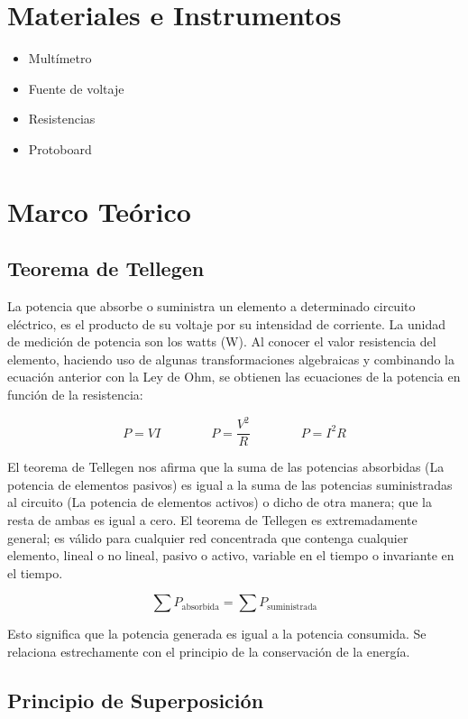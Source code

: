 \documentclass{article}
\begin{document}
    \section{Materiales e Instrumentos}

    \begin{itemize}
        \item Multímetro
        \item Fuente de voltaje
        \item Resistencias
        \item Protoboard
    \end{itemize}

    \section{Marco Teórico}

    \subsection{Teorema de Tellegen}

    La potencia que absorbe o suministra un elemento a determinado circuito eléctrico, es el producto de su voltaje por su intensidad de corriente. La unidad de medición de potencia son los watts (\unit{\watt}). Al conocer el valor resistencia del elemento, haciendo uso de algunas transformaciones algebraicas y combinando la ecuación anterior con la Ley de Ohm, se obtienen las ecuaciones de la potencia en función de la resistencia:

    \[
        P = VI \qquad\qquad P = \frac{V^2}{R} \qquad\qquad P = I^2 R
    \]

    El teorema de Tellegen nos afirma que la suma de las potencias absorbidas (La potencia de elementos pasivos) es igual a la suma de las potencias suministradas al circuito (La potencia de elementos activos) o dicho de otra manera; que la resta de ambas es igual a cero. El teorema de Tellegen es extremadamente general; es válido para cualquier red concentrada que contenga cualquier elemento, lineal o no lineal, pasivo o activo, variable en el tiempo o invariante en el tiempo.

    \[
        \sum P_{\text{absorbida}} = \sum P_{\text{suministrada}}
    \]

    Esto significa que la potencia generada es igual a la potencia consumida. Se relaciona estrechamente con el principio de la conservación de la energía.

    \subsection{Principio de Superposición}
\end{document}
